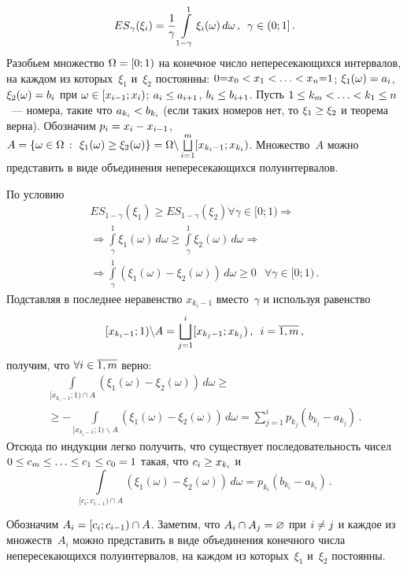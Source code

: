 \begin{multicols}{2}
\noindent
$$
{ES}_\gamma(\xi_i) = \displaystyle\frac{\displaystyle 1\mathstrut}{\displaystyle \gamma\mathstrut} 
\int\limits_{1-\gamma}^1{\xi_i(\omega)\,d\omega}\,,\enskip \gamma\in (0;1]\,.
$$
Разобьем множество $\Omega\hm=[0;1)$ на конечное число непересекающихся
интервалов, на каждом из которых~$\xi_1$ и~$\xi_2$ постоянны:
$0{=}x_0\hm<x_1\hm<\ldots\hm<x_n{=}1$;
$\xi_1(\omega)\hm=a_i$, $\xi_2(\omega)\hm=b_i$ при
$\omega\hm\in [x_{i-1};x_i)$; $a_i\hm\le a_{i+1}$, $b_i \hm\le b_{i+1}$.
Пусть $1\le k_m \hm< \ldots \hm< k_1\le n$~--- номера, такие что $a_{k_i}
\hm< b_{k_i}$ (если таких номеров нет, то $\xi_1\hm\ge\xi_2$ и теорема
верна). Обозначим $p_i\hm=x_i\hm-x_{i-1}$,
$A\hm=\Set{\omega\hm\in\Omega}{\xi_1(\omega)\ge\xi_2(\omega)}\hm=\Omega
\backslash \bigsqcup\limits_{i=1}^m [x_{k_i-1};x_{k_i})$.
Множество~$A$ можно представить в виде объединения непересекающихся полуинтервалов.

По условию
\begin{multline*}
{ES}_{1-\gamma}(\xi_1) \ge {ES}_{1-\gamma}(\xi_2) \forall \gamma\in [0;1) \Rightarrow{}\\
{}\Rightarrow
\int\limits_\gamma^1 \xi_1(\omega)\,d\omega \ge \int\limits_\gamma^1 \xi_2(\omega)\,d\omega \Rightarrow {}\\
{}
\Rightarrow \int\limits_\gamma^1 (\xi_1(\omega)-\xi_2(\omega))\,d\omega \ge 0 \; \ \ \forall \gamma \in [0;1)\,.
\end{multline*}
Подставляя в последнее неравенство $x_{k_i-1}$ вмес\-то~$\gamma$ и используя равенство
$$
[x_{k_i-1};1) \backslash A = \bigsqcup\limits_{j=1}^{i} [x_{k_j-1};x_{k_j})\,,\enskip
i=\overline{1,m}\,,
$$
получим, что $\forall i \hm\in \overline{1,m}$ верно:
\begin{multline*}
\int\limits_{[x_{k_i-1};1)\cap A}(\xi_1(\omega)-\xi_2(\omega))\,d\omega \ge{}\\
{}\ge
-\!\!\! \int\limits_{[x_{k_i-1};1)\backslash A}\!\!\!(\xi_1(\omega)-\xi_2(\omega))\,d\omega =
\sum\limits_{j=1}^{i} p_{k_j}(b_{k_j} - a_{k_j})\,.
\end{multline*}
Отсюда по индукции легко получить, что существует
последовательность чисел
$0\hm \le c_m \hm\le \ldots \hm\le c_1 \hm\le c_0 \hm= 1$ такая, что $c_i\hm\ge
x_{k_i}$ и 
$$
\int\limits_{[c_i;c_{i-1})\cap A}(\xi_1(\omega)-\xi_2(\omega))\,d\omega
=p_{k_i}(b_{k_i} - a_{k_i})\,.
$$

Обозначим $A_i \hm= [c_i;c_{i-1}) \cap A$. Заметим, что
$A_i\cap A_j \hm= \varnothing$ при $i\hm\neq j$ и каждое из множеств~$A_i$ 
можно представить в виде объединения конечного чис\-ла
непересекающихся полуинтервалов, на каждом из которых~$\xi_1$ и~$\xi_2$ постоянны.


\end{multicols}
